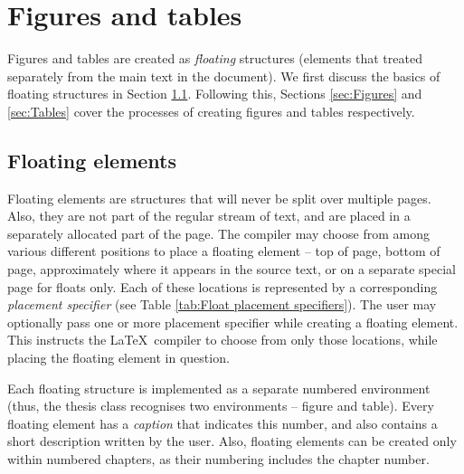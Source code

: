 \documentclass[twoside,openany]{thesis}
\begin{document}
\chapter{Figures and tables}\label{ch:Figures and tables}

Figures and tables are created as {\itshape floating} structures (elements that treated separately from the main text in the document).
We first discuss the basics of floating structures in Section \ref{sec:Floating elements}.
Following this, Sections \ref{sec:Figures} and \ref{sec:Tables} cover the processes of creating figures and tables respectively.

\section{Floating elements}\label{sec:Floating elements}

Floating elements are structures that will never be split over multiple pages.
Also, they are not part of the regular stream of text, and are placed in a separately allocated part of the page.
The compiler may choose from among various different positions to place a floating element -- top of page, bottom of page, approximately where it appears in the source text, or on a separate special page for floats only.
Each of these locations is represented by a corresponding {\itshape placement specifier} (see Table \ref{tab:Float placement specifiers}).
The user may optionally pass one or more placement specifier while creating a floating element.
This instructs the \LaTeX\ compiler to choose from only those locations, while placing the floating element in question.

Each floating structure is implemented as a separate numbered environment (thus, the {\ttfamily thesis} class recognises two environments -- {\ttfamily figure} and {\ttfamily table}).
Every floating element has a {\itshape caption} that indicates this number, and also contains a short description written by the user.
Also, floating elements can be created only within numbered chapters, as their numbering includes the chapter number.
\end{document}
